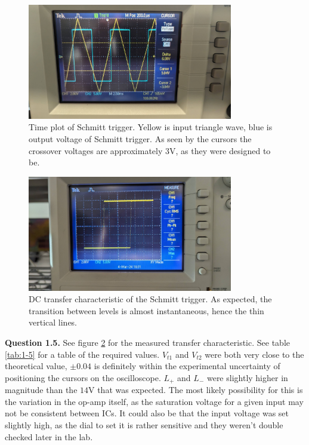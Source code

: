 \documentclass[letterpaper, reqno,11pt]{article}
\begin{document}
\begin{figure}[htpb]
    \centering
    \includegraphics[width=0.8\textwidth]{1-4}
    \caption{Time plot of Schmitt trigger. Yellow is input triangle wave, blue is output voltage of Schmitt trigger. As seen by the cursors the crossover voltages are approximately $3$V, as they were designed to be.}
    \label{fig:1-4}
\end{figure}

\begin{figure}[htpb]
    \centering
    \includegraphics[width=0.8\textwidth]{1-5}
    \caption{DC transfer characteristic of the Schmitt trigger. As expected, the transition between levels is almost instantaneous, hence the thin vertical lines.}
    \label{fig:1-5}
\end{figure}

{\medskip\noindent\bf Question 1.5.} See figure \ref{fig:1-5} for the measured transfer characteristic. See table \ref{tab:1-5} for a table of the required values. $V_{t1}$ and $V_{t2}$ were both very close to the theoretical value, $\pm 0.04$ is definitely within the experimental uncertainty of positioning the cursors on the oscilloscope. $L_+$ and $L_-$ were slightly higher in magnitude than the $14$V that was expected. The most likely possibility for this is the variation in the op-amp itself, as the saturation voltage for a given input may not be consistent between ICs. It could also be that the input voltage was set slightly high, as the dial to set it is rather sensitive and they weren't double checked later in the lab.
\end{document}

